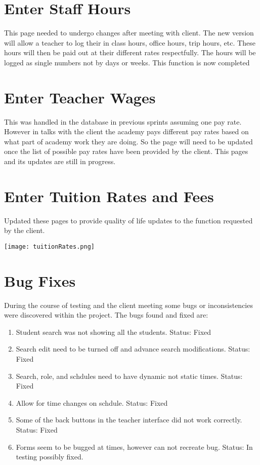 \documentclass[11pt]{book}
\begin{document}
\section{Enter Staff Hours}
This page needed to undergo changes after meeting with client. The new version will allow a teacher to log their in class hours, office hours, trip hours, etc. These hours will then be paid out at their different rates respectfully. The hours will be logged as single numbers not by days or weeks. This function is now completed

\section{Enter Teacher Wages}
This was handled in the database in previous sprints assuming one pay rate. However in talks with the client the academy pays different pay rates based on what part of academy work they are doing. So the page will need to be updated once the list of possible pay rates have been provided by the client. This pages and its updates are still in progress. 

\section{Enter Tuition Rates and Fees}
Updated these pages to provide quality of life updates to the function requested by the client.

\texttt{[image: tuitionRates.png]}

\section{Bug Fixes}
During the course of testing and the client meeting some bugs or inconsistencies were discovered within the project. The bugs found and fixed are:

\begin{enumerate}
\item Student search was not showing all the students. Status: Fixed
\item Search edit need to be turned off and advance search modifications. Status: Fixed
\item Search, role, and schdules need to have dynamic not static times. Status: Fixed
\item Allow for time changes on schdule. Status: Fixed
\item Some of the back buttons in the teacher interface did not work correctly. Status: Fixed
\item Forms seem to be bugged at times, however can not recreate bug. Status: In testing possibly fixed.  
\end{enumerate}
\end{document}
